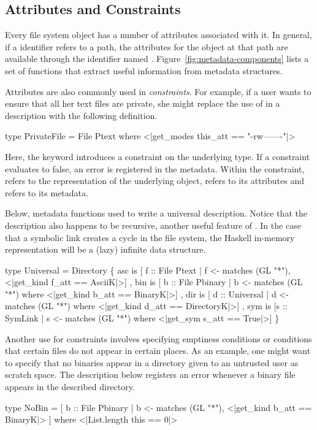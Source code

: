 \subsection{Attributes and Constraints}
\label{sec:constraints}

Every file system object has a number of attributes associated with it.  In general,
if a \forest{} identifier  refers to a path, the attributes for the object at that
path are available through the identifier named . Figure~\ref{fig:metadata-components}
lists a set of functions that extract useful information from metadata structures.

Attributes are also commonly used in {\em constraints}.  For example, if a user
wants to ensure that all her text files are private,
she might replace the use of  in a description with the following
 definition.  
\begin{code}
type PrivateFile = 
  File Ptext 
    where <|get_modes this_att == "-rw-------"|>
\end{code}
Here, the keyword  introduces a constraint
on the underlying type.  If a constraint evaluates to false, an error
is registered in the metadata.  Within the constraint,  refers to the representation 
of the underlying object,  refers to its attributes and  refers
to its metadata.


Below, metadata functions used to write a universal description.
Notice that the description also happens to be recursive, another useful feature of
\forest{}.  In the case that a symbolic link creates a cycle in the file system, the Haskell
in-memory representation will be a (lazy) infinite data structure. 
\begin{code}
type Universal = Directory 
  \{ asc is [ f :: File Ptext   
           | f <- matches (GL "*"), 
            <|get_kind f_att == AsciiK|>]
  , bin is [ b :: File Pbinary
           | b <- matches (GL "*") 
           where <|get_kind b_att == BinaryK|>]
  , dir is [ d :: Universal  
           | d <- matches (GL "*") 
           where <|get_kind d_att == DirectoryK|>]
  , sym is [s :: SymLink      
           | s <- matches (GL "*") 
           where <|get_sym s_att == True|>]
  \}
\end{code}


Another use for constraints involves specifying emptiness conditions or conditions that
certain files do not appear in certain places.  As an example, one might want to specify
that no binaries appear in a directory given to an untrusted user as scratch space.
The description below registers an error whenever a binary file appears in the described
directory. 
\begin{code}
type NoBin =
  [ b :: File Pbinary 
  | b <- matches (GL "*"), 
  <|get_kind b_att == BinaryK|> ]
  where <|List.length this == 0|>
\end{code}

